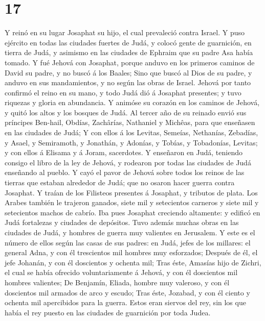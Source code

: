 \hypertarget{section-16}{%
\section{17}\label{section-16}}

 Y reinó en su lugar Josaphat su hijo, el cual prevaleció
contra Israel.  Y puso ejército en todas las ciudades
fuertes de Judá, y colocó gente de guarnición, en tierra de Judá, y
asimismo en las ciudades de Ephraim que su padre Asa había tomado.
 Y fué Jehová con Josaphat, porque anduvo en los primeros
caminos de David su padre, y no buscó á los Baales;  Sino
que buscó al Dios de su padre, y anduvo en sus mandamientos, y no según
las obras de Israel.  Jehová por tanto confirmó el reino
en su mano, y todo Judá dió á Josaphat presentes; y tuvo riquezas y
gloria en abundancia.  Y animóse su corazón en los caminos
de Jehová, y quitó los altos y los bosques de Judá.  Al
tercer año de su reinado envió sus príncipes Ben-hail, Obdías,
Zachârías, Nathaniel y Michêas, para que enseñasen en las ciudades de
Judá;  Y con ellos á los Levitas, Semeías, Nethanías,
Zebadías, y Asael, y Semiramoth, y Jonathán, y Adonías, y Tobías, y
Tobadonías, Levitas; y con ellos á Elisama y á Joram, sacerdotes.
 Y enseñaron en Judá, teniendo consigo el libro de la ley
de Jehová, y rodearon por todas las ciudades de Judá enseñando al
pueblo.  Y cayó el pavor de Jehová sobre todos los reinos
de las tierras que estaban alrededor de Judá; que no osaron hacer guerra
contra Josaphat.  Y traían de los Filisteos presentes á
Josaphat, y tributos de plata. Los Arabes también le trajeron ganados,
siete mil y setecientos carneros y siete mil y setecientos machos de
cabrío.  Iba pues Josaphat creciendo altamente: y edificó
en Judá fortalezas y ciudades de depósitos.  Tuvo además
muchas obras en las ciudades de Judá, y hombres de guerra muy valientes
en Jerusalem.  Y este es el número de ellos según las
casas de sus padres: en Judá, jefes de los millares: el general Adna, y
con él trescientos mil hombres muy esforzados;  Después
de él, el jefe Johanán, y con él doscientos y ochenta mil;
 Tras éste, Amasías hijo de Zichri, el cual se había
ofrecido voluntariamente á Jehová, y con él doscientos mil hombres
valientes;  De Benjamín, Eliada, hombre muy valeroso, y
con él doscientos mil armados de arco y escudo;  Tras
éste, Jozabad, y con él ciento y ochenta mil apercibidos para la guerra.
 Estos eran siervos del rey, sin los que había el rey
puesto en las ciudades de guarnición por toda Judea.

